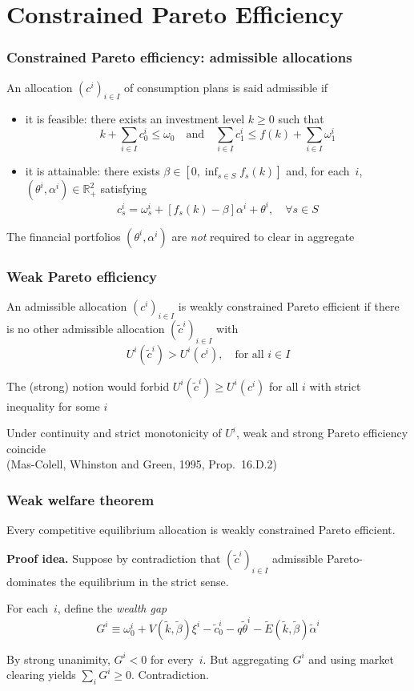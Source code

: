 \documentclass[blue]{beamer}
\def\R{\mathbb{R}}
\def\leq{\leqslant}
\def\geq{\geqslant}
\def\et{\quad \textrm{and} \quad}
\theoremstyle{definition}
\theoremstyle{example}
\begin{document}
\section{Constrained Pareto Efficiency}
\begin{frame}\frametitle{Constrained Pareto efficiency: admissible allocations}
\begin{definition}
An allocation $(c^i)_{i\in I}$ of consumption plans is said \alert{admissible} if
\begin{itemize}
\item it is feasible: there exists an investment level $k\geq 0$ such that
\[
k + \sum_{i\in I} c^i_0 \leq \omega_0 \et \sum_{i\in I} c^i_1 \leq f(k) +  \sum_{i\in I} \omega^i_1
\]
\item it is attainable: there exists $\beta \in [0, \inf_{s\in S} f_s(k)]$ and, for each~$i$, $(\theta^i,\alpha^i) \in \R_+^2$ satisfying
    \[
    c^i_s = \omega^i_s + [f_s(k) - \beta] \alpha^i + \theta^i, \quad \forall s\in S
    \]
\end{itemize}
\end{definition}
\bigskip
The financial portfolios $(\theta^i, \alpha^i)$ are \emph{not} required to clear in aggregate
\end{frame}
\begin{frame}\frametitle{Weak Pareto efficiency}
\begin{definition}
An admissible allocation $(c^i)_{i\in I}$ is \alert{weakly constrained Pareto efficient} if there is no other admissible allocation $(\widetilde{c}^i)_{i\in I}$ with
\[
U^i(\widetilde{c}^i) > U^i(c^i), \quad \text{for all $i\in I$}
\]
\end{definition}
\bigskip
The (strong) notion would forbid $U^i(\widetilde{c}^i)\geq U^i(c^i)$ for all $i$ with strict inequality for some $i$
\bigskip

Under continuity and strict monotonicity of $U^i$, weak and strong Pareto efficiency \alert{coincide} \\
\hfill\small(Mas-Colell, Whinston and Green, 1995, Prop.~16.D.2)
\end{frame}
\begin{frame}\frametitle{Weak welfare theorem}
\begin{theorem}
Every competitive equilibrium allocation is weakly constrained Pareto efficient.
\end{theorem}
\bigskip

\textbf{Proof idea.} Suppose by contradiction that $(\widetilde{c}^i)_{i \in I}$ admissible Pareto-dominates the equilibrium in the strict sense.

For each~$i$, define the \emph{wealth gap}
\[
G^i \equiv \omega^i_0 + V(\widetilde{k}, \widetilde{\beta}) \xi^i - \widetilde{c}^i_0 - q \widetilde{\theta}^i - \widetilde{E}(\widetilde{k}, \widetilde{\beta}) \widetilde{\alpha}^i
\]

By strong unanimity, $G^i < 0$ for every~$i$. But aggregating $G^i$ and using market clearing yields $\sum_i G^i \geq 0$. Contradiction.
\end{frame}
\end{document}
